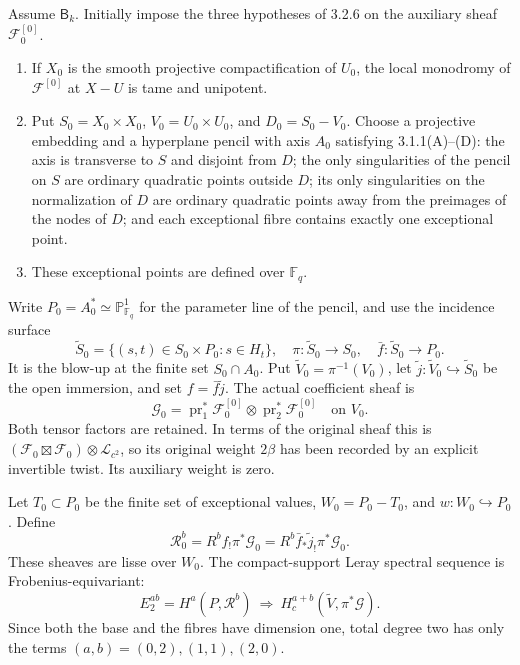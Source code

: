 Assume \(\mathsf B_k\). Initially impose the three hypotheses of
3.2.6 on the auxiliary sheaf \(\mathcal F_0^{[0]}\).

\begin{enumerate}
\item[(A)] If \(X_0\) is the smooth projective compactification of
\(U_0\), the local monodromy of \(\mathcal F^{[0]}\) at
\(X-U\) is tame and unipotent.
\item[(B)] Put \(S_0=X_0\times X_0\),
\(V_0=U_0\times U_0\), and \(D_0=S_0-V_0\). Choose a projective
embedding and a hyperplane pencil with axis \(A_0\) satisfying
3.1.1(A)--(D): the axis is transverse to \(S\) and disjoint from
\(D\); the only singularities of the pencil on \(S\) are ordinary
quadratic points outside \(D\); its only singularities on the
normalization of \(D\) are ordinary quadratic points away from the
preimages of the nodes of \(D\); and each exceptional fibre contains
exactly one exceptional point.
\item[(C)] These exceptional points are defined over \(\mathbb F_q\).
\end{enumerate}

Write \(P_0=A_0^*\simeq\mathbb P^1_{\mathbb F_q}\) for the
parameter line of the pencil, and use the incidence surface
\[
 \widetilde S_0=\{(s,t)\in S_0\times P_0:s\in H_t\},
 \quad \pi:\widetilde S_0\longrightarrow S_0,
 \quad\bar f:\widetilde S_0\longrightarrow P_0.
 \tag{WDB9}
\]
It is the blow-up at the finite set \(S_0\cap A_0\). Put
\(\widetilde V_0=\pi^{-1}(V_0)\), let
\(\widetilde j:\widetilde V_0\hookrightarrow\widetilde S_0\)
be the open immersion, and set \(f=\bar f\widetilde j\).
The actual coefficient sheaf is
\[
 \mathcal G_0
 =\operatorname{pr}_1^*\mathcal F_0^{[0]}
   \otimes\operatorname{pr}_2^*\mathcal F_0^{[0]}
 \quad\text{on }V_0.
 \tag{WDB10}
\]
Both tensor factors are retained. In terms of the original sheaf this
is \((\mathcal F_0\boxtimes\mathcal F_0)\otimes\mathcal L_{c^2}\),
so its original weight \(2\beta\) has been recorded by an explicit
invertible twist. Its auxiliary weight is zero.

Let \(T_0\subset P_0\) be the finite set of exceptional values,
\(W_0=P_0-T_0\), and \(w:W_0\hookrightarrow P_0\). Define
\[
 \mathcal R^b_0=R^b f_!\pi^*\mathcal G_0
   =R^b\bar f_*\widetilde j_!\pi^*\mathcal G_0.
 \tag{WDB11}
\]
These sheaves are lisse over \(W_0\). The compact-support Leray
spectral sequence is Frobenius-equivariant:
\[
 E_2^{ab}=H^a(P,\mathcal R^b)
 \ \Longrightarrow\ H_c^{a+b}(\widetilde V,\pi^*\mathcal G).
 \tag{WDB12}
\]
Since both the base and the fibres have dimension one, total degree
two has only the terms \((a,b)=(0,2),(1,1),(2,0)\).

